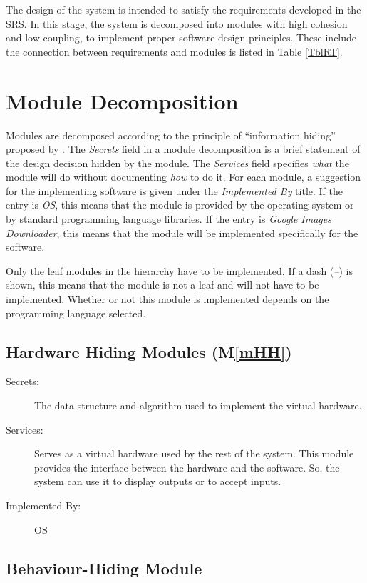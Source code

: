 \documentclass[12pt, titlepage]{article}
\newcommand{\mref}[1]{M\ref{#1}}
\begin{document}
The design of the system is intended to satisfy the requirements developed in the SRS. In this stage, the system is decomposed into modules with high cohesion and low coupling, to implement proper software design principles. These include the connection between requirements and modules is listed in Table \ref{TblRT}.

\newpage

\section{Module Decomposition} \label{SecMD}

Modules are decomposed according to the principle of ``information hiding''
proposed by \citet{ParnasEtAl1984}. The \emph{Secrets} field in a module
decomposition is a brief statement of the design decision hidden by the
module. The \emph{Services} field specifies \emph{what} the module will do
without documenting \emph{how} to do it. For each module, a suggestion for the
implementing software is given under the \emph{Implemented By} title. If the
entry is \emph{OS}, this means that the module is provided by the operating
system or by standard programming language libraries.  If the entry is 
\emph{Google Images Downloader}, this means that the module will be implemented 
specifically for the software.

Only the leaf modules in the
hierarchy have to be implemented. If a dash (\emph{--}) is shown, this means
that the module is not a leaf and will not have to be implemented. Whether or
not this module is implemented depends on the programming language
selected.

\subsection{Hardware Hiding Modules (\mref{mHH})}

\begin{description}
\item[Secrets:]The data structure and algorithm used to implement the virtual
  hardware.
\item[Services:]Serves as a virtual hardware used by the rest of the
  system. This module provides the interface between the hardware and the
  software. So, the system can use it to display outputs or to accept inputs.
\item[Implemented By:] OS
\end{description}

\subsection{Behaviour-Hiding Module}
\end{document}

